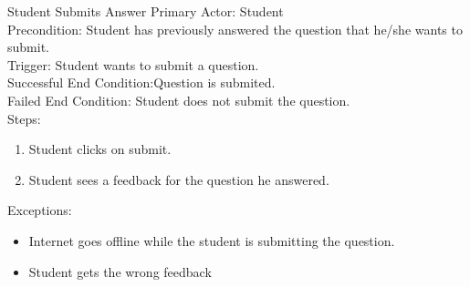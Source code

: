     
    \begin{section}{Student Submits Answer}
    Primary Actor: Student\\
    Precondition: Student has previously answered the question that he/she wants to submit.\\
    Trigger: Student wants to submit a question.\\
    Successful End Condition:Question is submited.\\
    Failed End Condition: Student does not submit the question.\\
    Steps:
    \begin{enumerate}
    \item Student clicks on submit.
    \item Student sees a feedback for the question he answered.
    \end{enumerate}
    Exceptions:
    \begin{itemize}
    
    \item Internet goes offline while the student is submitting the question.
    \item Student gets the wrong feedback
    
    \end{itemize}
    \end{section}
    


